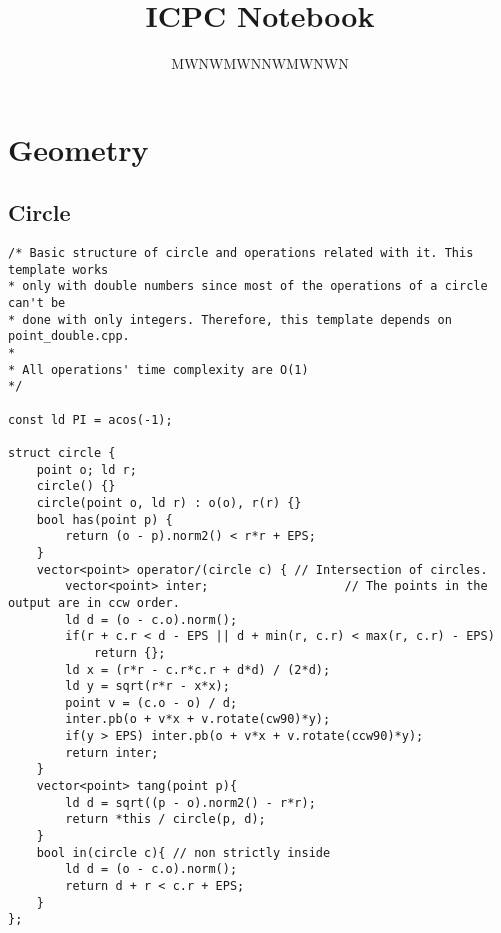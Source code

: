 \documentclass{article}
\title{ICPC Notebook}
\author{MWNWMWNNWMWNWN}
\date{}
\begin{document}
\maketitle
\tableofcontents

\section{Geometry}
\subsection{Circle}
\begin{verbatim}
/* Basic structure of circle and operations related with it. This template works
* only with double numbers since most of the operations of a circle can't be 
* done with only integers. Therefore, this template depends on point_double.cpp.
*
* All operations' time complexity are O(1)
*/

const ld PI = acos(-1);

struct circle {
    point o; ld r;
    circle() {}
    circle(point o, ld r) : o(o), r(r) {}
    bool has(point p) { 
        return (o - p).norm2() < r*r + EPS;
    }
    vector<point> operator/(circle c) { // Intersection of circles.
        vector<point> inter;                   // The points in the output are in ccw order.
        ld d = (o - c.o).norm();
        if(r + c.r < d - EPS || d + min(r, c.r) < max(r, c.r) - EPS)
            return {};
        ld x = (r*r - c.r*c.r + d*d) / (2*d);
        ld y = sqrt(r*r - x*x);
        point v = (c.o - o) / d;
        inter.pb(o + v*x + v.rotate(cw90)*y);
        if(y > EPS) inter.pb(o + v*x + v.rotate(ccw90)*y);
        return inter;
    }
    vector<point> tang(point p){
        ld d = sqrt((p - o).norm2() - r*r);
        return *this / circle(p, d);
    }
    bool in(circle c){ // non strictly inside
        ld d = (o - c.o).norm();
        return d + r < c.r + EPS;
    }
};
\end{verbatim}
\end{document}

